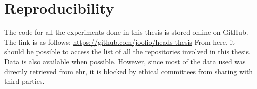 \chapter*{Reproducibility}


The code for all the experiments done in this thesis is stored online on GitHub.
The link is as follows: \url{https://github.com/joofio/heads-thesis}
From here, it should be possible to access the list of all the repositories involved in this thesis.
Data is also available when possible. However, since most of the data used was directly retrieved from \acl{ehr}, it is blocked by ethical committees from sharing with third parties.
